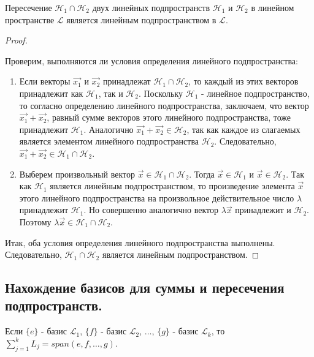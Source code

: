 \begin{theorem}
    Пересечение $\mathcal{H}_1 \cap \mathcal{H}_2$ двух линейных подпространств $\mathcal{H}_1$ и $\mathcal{H}_2$ в линейном пространстве $\mathcal{L}$ является линейным подпространством в $\mathcal{L}$.
\end{theorem}

\begin{proof}~

    Проверим, выполняются ли условия определения линейного подпространства:
    \begin{enumerate}[nosep]
        \item Если векторы $\vec{x_1}$ и $\vec{x_2}$ принадлежат $\mathcal{H}_1 \cap \mathcal{H}_2$, то каждый из этих векторов принадлежит как $\mathcal{H}_1$, так и $\mathcal{H}_2$. Поскольку $\mathcal{H}_1$ - линейное подпространство, то согласно определению линейного подпространства, заключаем, что вектор $\vec{x_1} + \vec{x_2}$, равный сумме векторов этого линейного подпространства, тоже принадлежит $\mathcal{H}_1$. Аналогично $\vec{x_1} + \vec{x_2} \in \mathcal{H}_2$, так как каждое из слагаемых является элементом линейного подпространства $\mathcal{H}_2$. Следовательно, $\vec{x_1} + \vec{x_2} \in \mathcal{H}_1 \cap \mathcal{H}_2$.
        \item Выберем произвольный вектор $\vec{x} \in \mathcal{H}_1 \cap \mathcal{H}_2$. Тогда $\vec{x} \in \mathcal{H}_1$ и $\vec{x} \in \mathcal{H}_2$. Так как $\mathcal{H}_1$ является линейным подпространством, то произведение элемента $\vec{x}$ этого линейного подпространства на произвольное действительное число $\lambda$ принадлежит $\mathcal{H}_1$. Но совершенно аналогично вектор $\lambda \vec{x}$ принадлежит и $\mathcal{H}_2$. Поэтому $\lambda \vec{x} \in \mathcal{H}_1 \cap \mathcal{H}_2$. 
    \end{enumerate}
    Итак, оба условия определения линейного подпространства выполнены. Следовательно, $\mathcal{H}_1 \cap \mathcal{H}_2$ является линейным подпространством.
\end{proof}


\newpage


\subsection{
    Нахождение базисов для суммы и пересечения подпространств.
}

\begin{theorem}
    Если $\{e\}$ - базис $\mathcal{L}_1$, $\{f\}$ - базис $\mathcal{L}_2$, $\ldots$, $\{g\}$ - базис $\mathcal{L}_k$, то $\sum_{j=1}^{k} L_j = span(e, f, \ldots, g)$.
\end{theorem}

